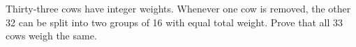 Thirty-three cows have integer weights. Whenever one cow is removed, the other 32 can be split into two groups of 16 with equal total weight. Prove that all 33 cows weigh the same.
